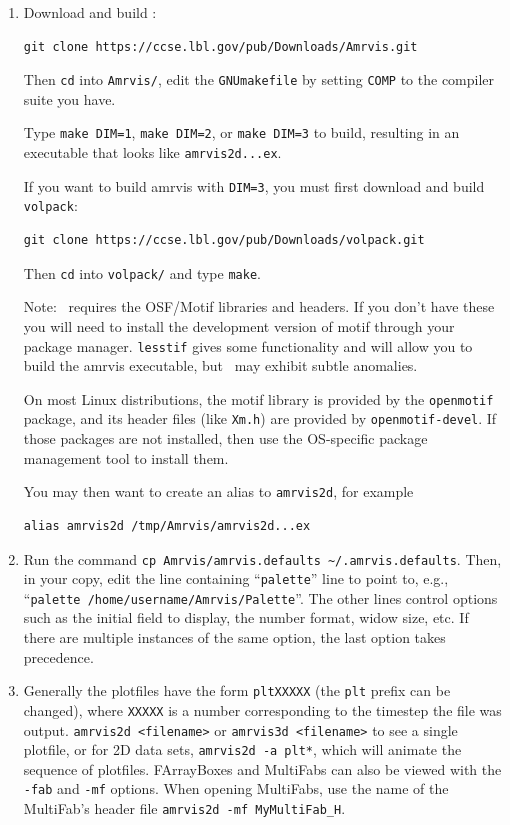 \begin{enumerate}

\item Download and build \amrvis:
\begin{verbatim}
git clone https://ccse.lbl.gov/pub/Downloads/Amrvis.git
\end{verbatim}

Then {\tt cd} into {\tt Amrvis/}, edit the {\tt GNUmakefile} by
setting {\tt COMP} to the compiler suite you have.

Type {\tt make DIM=1}, {\tt make DIM=2}, or {\tt make DIM=3} to build, 
resulting in an executable that looks like {\tt amrvis2d...ex}.

If you want to build amrvis with {\tt DIM=3}, you must first
download and build {\tt volpack}:
\begin{verbatim}
git clone https://ccse.lbl.gov/pub/Downloads/volpack.git
\end{verbatim}

Then {\tt cd} into {\tt volpack/} and type {\tt make}.

Note: \amrvis\ requires the OSF/Motif libraries and headers. If you don't have these 
you will need to install the development version of motif through your package manager. 
{\tt lesstif} gives some functionality and will allow you to build the amrvis executable, 
but \amrvis\ may exhibit subtle anomalies.

On most Linux distributions, the motif library is provided by the
{\tt openmotif} package, and its header files (like {\tt Xm.h}) are provided
by {\tt openmotif-devel}. If those packages are not installed, then use the
OS-specific package management tool to install them. 

You may then want to create an alias to {\tt amrvis2d}, for example
\begin{verbatim}
alias amrvis2d /tmp/Amrvis/amrvis2d...ex
\end{verbatim}

\item Run the command {\tt cp Amrvis/amrvis.defaults \textasciitilde/.amrvis.defaults}.
Then, in your copy, edit the line containing ``{\tt palette}'' line to point to, e.g., 
``{\tt palette  /home/username/Amrvis/Palette}''.  The other lines control
options such as the initial field to display, the number format, widow size, etc.
If there are multiple instances of the same option, the last option takes precedence.

\item Generally the plotfiles have the form {\tt pltXXXXX} 
  (the {\tt plt} prefix can be changed), where {\tt XXXXX} is a number 
  corresponding to the timestep the file
  was output.  {\tt amrvis2d <filename>} or {\tt amrvis3d <filename>}
  to see a single plotfile, 
  or for 2D data sets, {\tt amrvis2d -a plt*}, which will animate the 
  sequence of plotfiles.  FArrayBoxes and MultiFabs can also be viewed with
  the {\tt -fab} and {\tt -mf} options.  When opening MultiFabs, use the
  name of the MultiFab's header file {\tt amrvis2d -mf MyMultiFab\_H}.


\end{enumerate}
